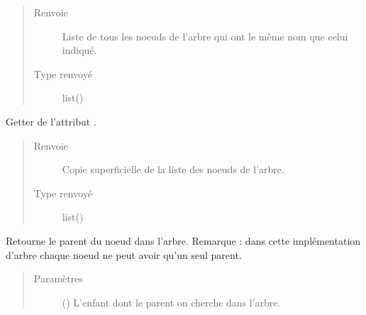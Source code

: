 \documentclass[letterpaper,10pt,french]{sphinxmanual}
\begin{document}
\begin{fulllineitems}
\begin{fulllineitems}
\begin{quote}
\begin{description}
\item[{Renvoie}] \leavevmode
{} \textendash{} Liste de tous les noeuds de l’arbre qui ont le même nom que celui
indiqué.

\item[{Type renvoyé}] \leavevmode
list({\hyperref[\detokenize{index:StrategyTree.NodeST}]{}})

\end{description}\end{quote}

\end{fulllineitems}


\begin{fulllineitems}
\label{\detokenize{index:StrategyTree.StrategyTree.get_nodes}}
Getter de l’attribut .
\begin{quote}\begin{description}
\item[{Renvoie}] \leavevmode
{} \textendash{} Copie superficielle de la liste des noeuds de l’arbre.

\item[{Type renvoyé}] \leavevmode
list({\hyperref[\detokenize{index:StrategyTree.NodeST}]{}})

\end{description}\end{quote}

\end{fulllineitems}


\begin{fulllineitems}
\label{\detokenize{index:StrategyTree.StrategyTree.get_parent}}
Retourne le parent du noeud  dans l’arbre. Remarque : dans cette
implémentation d’arbre chaque noeud ne peut avoir qu’un seul parent.
\begin{quote}\begin{description}
\item[{Paramètres}] \leavevmode
{} () \textendash{} L’enfant dont le parent on cherche dans l’arbre.


\end{description}
\end{quote}
\end{fulllineitems}
\end{fulllineitems}
\end{document}
